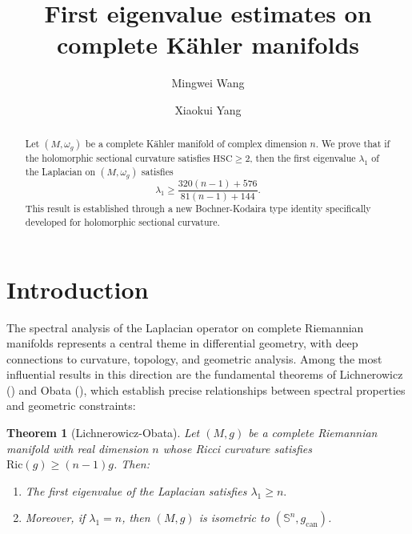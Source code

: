 \documentclass[12pt, reqno]{amsart}
\title{First eigenvalue estimates on complete K\"ahler manifolds}
\author{Mingwei Wang}
\author{Xiaokui Yang}
\theoremstyle{plain}
\newtheorem{thm}{Theorem}[section]
\theoremstyle{definition}
\newcommand{\btheorem}{\begin{thm}}
\newcommand{\etheorem}{\end{thm}}
\newcommand{\bd}{\begin{enumerate}}
\newcommand{\ed}{\end{enumerate}}
\renewcommand{\S}{{\mathbb S}}
\renewcommand{\>}{\rightarrow}
\renewcommand{\#}{\sharp}
\numberwithin{equation}{section} %
\begin{document}
    \begin{abstract}  Let $ (M,\omega_g) $ be a complete K\"ahler manifold of complex dimension $n$.
     We prove that if the holomorphic sectional curvature satisfies $\mathrm{HSC}  \geq 2 $,
    then the first eigenvalue $\lambda_1$ of the Laplacian on $(M,\omega_g)$ satisfies $$ \lambda_1 \geq \frac{320(n-1)+576}{81(n-1)+144}.$$
    This result is established through a new Bochner-Kodaira type identity specifically developed for holomorphic sectional curvature.
    \end{abstract}



    \maketitle


\section{Introduction}

The spectral analysis of the Laplacian operator on complete Riemannian manifolds
represents a central theme in differential geometry, with deep connections to curvature,
topology, and geometric analysis. Among the most influential results in this
direction are the fundamental theorems of Lichnerowicz (\cite{Lic58})
and Obata (\cite{Oba62}), which establish precise relationships between spectral properties and geometric constraints:
\btheorem[Lichnerowicz-Obata]
Let $(M,g)$ be a complete Riemannian manifold with real dimension $n$ whose Ricci curvature satisfies $\mathrm{Ric}(g)\geq(n-1)g$. Then:
\bd\item The first eigenvalue of the Laplacian  satisfies
$
\lambda_1\geq n.
$
\item Moreover, if $\lambda_1=n$, then $(M,g)$ is isometric to $\left(\S^n,g_{\mathrm{can}}\right)$.
\ed
\etheorem
\end{document}
